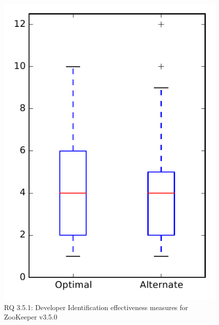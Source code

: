 
\begin{figure}
\centering
\includegraphics[height=0.4\textheight]{figures/combo/dit_rq1_zookeeper}
\caption{RQ 3.5.1: Developer Identification effectiveness measures for ZooKeeper v3.5.0}
\label{fig:dit:rq1:zookeeper}
\end{figure}
